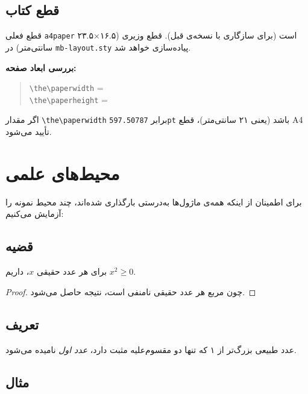 \documentclass{matinbook}
\begin{document}
\subsection{قطع کتاب}

قطع فعلی \verb|a4paper| است (برای سازگاری با نسخه‌ی قبل).
قطع وزیری (۱۶.۵×۲۳.۵ سانتی‌متر) در \verb|mb-layout.sty| پیاده‌سازی
خواهد شد.

\textbf{بررسی ابعاد صفحه:}

\begin{quote}
\verb|\the\paperwidth| = \the\paperwidth \\
\verb|\the\paperheight| = \the\paperheight
\end{quote}

اگر مقدار \verb|\the\paperwidth| برابر \verb|597.50787pt| باشد
(یعنی ۲۱ سانتی‌متر)، قطع A4 تأیید می‌شود.

\section{محیط‌های علمی}
\label{sec:environments}

برای اطمینان از اینکه همه‌ی ماژول‌ها به‌درستی بارگذاری شده‌اند،
چند محیط نمونه را آزمایش می‌کنیم:

\subsection{قضیه}

\begin{theorem}
    برای هر عدد حقیقی $x$، داریم $x^2 \geq 0$.
\end{theorem}

\begin{proof}
    چون مربع هر عدد حقیقی نامنفی است، نتیجه حاصل می‌شود.
\end{proof}

\subsection{تعریف}

\begin{definition}
    عدد طبیعی بزرگ‌تر از ۱ که تنها دو مقسوم‌علیه مثبت دارد،
    \emph{عدد اول} نامیده می‌شود.
\end{definition}

\subsection{مثال}
\end{document}
